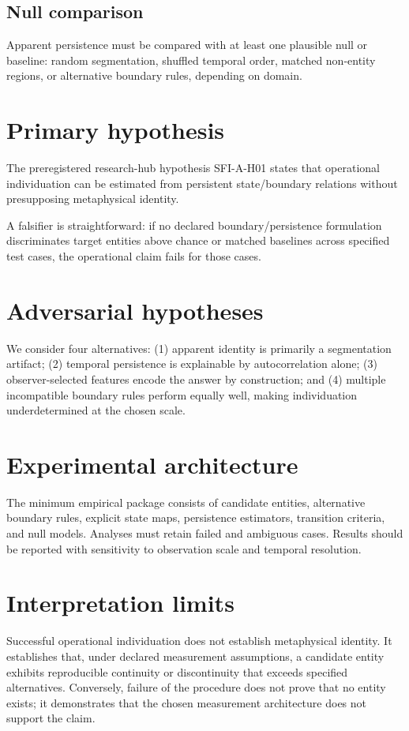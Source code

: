 \documentclass[11pt]{article}
\begin{document}
\subsection{Null comparison}
Apparent persistence must be compared with at least one plausible null or baseline: random segmentation, shuffled temporal order, matched non-entity regions, or alternative boundary rules, depending on domain.

\section{Primary hypothesis}
The preregistered research-hub hypothesis SFI-A-H01 states that operational individuation can be estimated from persistent state/boundary relations without presupposing metaphysical identity.

A falsifier is straightforward: if no declared boundary/persistence formulation discriminates target entities above chance or matched baselines across specified test cases, the operational claim fails for those cases.

\section{Adversarial hypotheses}
We consider four alternatives: (1) apparent identity is primarily a segmentation artifact; (2) temporal persistence is explainable by autocorrelation alone; (3) observer-selected features encode the answer by construction; and (4) multiple incompatible boundary rules perform equally well, making individuation underdetermined at the chosen scale.

\section{Experimental architecture}
The minimum empirical package consists of candidate entities, alternative boundary rules, explicit state maps, persistence estimators, transition criteria, and null models. Analyses must retain failed and ambiguous cases. Results should be reported with sensitivity to observation scale and temporal resolution.

\section{Interpretation limits}
Successful operational individuation does not establish metaphysical identity. It establishes that, under declared measurement assumptions, a candidate entity exhibits reproducible continuity or discontinuity that exceeds specified alternatives. Conversely, failure of the procedure does not prove that no entity exists; it demonstrates that the chosen measurement architecture does not support the claim.
\end{document}
